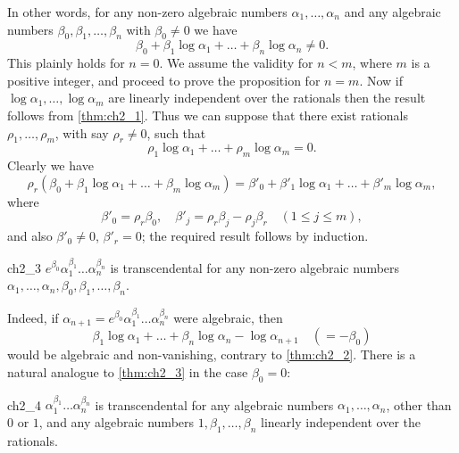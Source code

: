In other words, for any non-zero algebraic numbers $\alpha_1, \dots, \alpha_n$ and any algebraic numbers $\beta_0, \beta_1, \dots, \beta_n$ with $\beta_0 \neq 0$ we have
\[
\beta_0 + \beta_1 \log \alpha_1 + \dots + \beta_n \log \alpha_n \neq 0.
\]
This plainly holds for $n = 0$. We assume the validity for $n < m$, where $m$ is a positive integer, and proceed to prove the proposition for $n = m$. Now if $\log \alpha_1, \dots, \log \alpha_m$ are linearly independent over the rationals then the result follows from \autoref{thm:ch2_1}. Thus we can suppose that there exist rationals $\rho_1, \dots, \rho_m$, with say $\rho_r \neq 0$, such that
\[
\rho_1 \log \alpha_1 + \dots + \rho_m \log \alpha_m = 0.
\]
Clearly we have
\[
\rho_r(\beta_0 + \beta_1 \log \alpha_1 + \dots + \beta_m \log \alpha_m) = \beta'_0 + \beta'_1 \log \alpha_1 + \dots + \beta'_m \log \alpha_m,
\]
where
\[
\beta'_0 = \rho_r \beta_0, \quad \beta'_j = \rho_r \beta_j - \rho_j \beta_r \quad (1 \le j \le m),
\]
and also $\beta'_0 \neq 0$, $\beta'_r = 0$; the required result follows by induction.

\begin{mythm}{}{ch2_3}
$e^{\beta_0} \alpha_1^{\beta_1} \dots \alpha_n^{\beta_n}$ is transcendental for any non-zero algebraic numbers $\alpha_1, \dots, \alpha_n, \beta_0, \beta_1, \dots, \beta_n$.
\end{mythm}

Indeed, if $\alpha_{n+1} = e^{\beta_0} \alpha_1^{\beta_1} \dots \alpha_n^{\beta_n}$ were algebraic, then
\[
\beta_1 \log \alpha_1 + \dots + \beta_n \log \alpha_n - \log \alpha_{n+1} \quad (= -\beta_0)
\]
would be algebraic and non-vanishing, contrary to \autoref{thm:ch2_2}. There is a natural analogue to \autoref{thm:ch2_3} in the case $\beta_0 = 0$:

\begin{mythm}{}{ch2_4}
$\alpha_1^{\beta_1} \dots \alpha_n^{\beta_n}$ is transcendental for any algebraic numbers $\alpha_1, \dots, \alpha_n$, other than $0$ or $1$, and any algebraic numbers $1, \beta_1, \dots, \beta_n$ linearly independent over the rationals.
\end{mythm}

